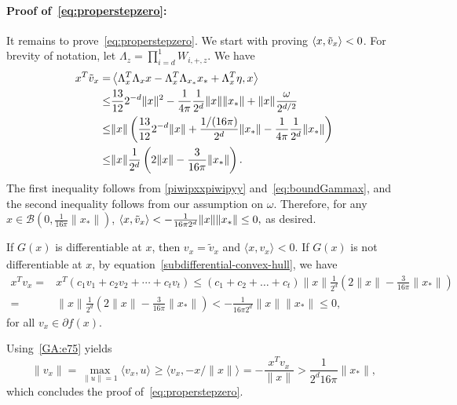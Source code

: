 \documentclass[11pt]{article}
\newcommand{\inner}[3][]{{\langle #2,#3 \rangle_{#1}}} %
\newcommand{\Tnorm}{}
\newcommand\norm[2][\Tnorm]{\ensuremath{{\left\|#2\right\|}_{#1}}}
\newcommand\Tinnerprod{}
\newcommand{\innerprod}[3][\Tinnerprod]{\ifthenelse{\equal{#1}{}}{\ensuremath{\left<#2,#3\right>}}{\ensuremath{\left<#2,#3\right>_{#1}}}}
\newcommand\stepdir[1]{\tilde v_{#1}}
\newcommand{\whcomm}[2]{{\color{black} #1}{\color{black} #2}} %
\begin{document}
\paragraph{Proof of~\eqref{eq:properstepzero}:}
It remains to prove~\eqref{eq:properstepzero}.
We start with proving $\innerprod{x}{\stepdir{x}} < 0$.
For brevity of notation, let $\Lambda_{z} = \prod_{i = d}^1 W_{i, +, z}$.
We have
\whcomm{}{
\begin{align*}
x^T \stepdir{x} =&
\innerprod{ \Lambda_x^T \Lambda_x x - \Lambda_x^T \Lambda_{x_*} x_* + \Lambda_x^T \eta }{x} \\
\leq&
\frac{13}{12}2^{-d} \|x\|^2 - \frac{1}{4 \pi} \frac{1}{2^d} \|x\| \|x_*\| +
\norm{x} \frac{\omega}{2^{d/2}} \\
\leq&
\|x\| \left( \frac{13}{12}2^{-d} \|x\| +
\frac{1/(16 \pi)}{2^{d}} \|x_*\|
- \frac{1}{4 \pi} \frac{1}{2^d} \|x_*\| \right) \\
\leq&
\|x\| \frac{1}{2^d} \left( 2\|x\| - \frac{3}{16 \pi} \|x_*\| \right).
\end{align*}
}
The first inequality follows from \eqref{piwipxxpiwipyy} and~\eqref{eq:boundGammax}, and the second inequality follows from our assumption on $\omega$.
Therefore, for any $x \in \mathcal{B}(0, \frac{1}{16\pi} \|x_*\|)$, 
\whcomm{}{
$
\innerprod{x}{ \stepdir{x} } < -\frac{1}{16 \pi 2^d} \|x\| \|x_*\| \leq 0,
$
}
as desired.

If $G(x)$ is differentiable at $x$, then $v_x = \tilde{v}_x$ and $\inner[]{x}{{v}_x} < 0$. If $G(x)$ is not differentiable at $x$, by equation~\eqref{subdifferential-convex-hull}, we have
\whcomm{}{
\begin{align}
x^T {v}_x =& x^T (c_1 v_1 + c_2 v_2 + \cdots + c_t v_t) \leq (c_1 + c_2 + \ldots + c_t) \|x\| \frac{1}{2^d} \left( 2\|x\| - \frac{3}{16 \pi} \|x_*\| \right) \nonumber \\
=& \|x\| \frac{1}{2^d} \left( 2\|x\| - \frac{3}{16 \pi} \|x_*\| \right) < -\frac{1}{16 \pi 2^d} \|x\| \|x_*\| \leq 0, \label{GA:e75}
\end{align}
}
for all $v_x \in \partial f(x)$.

\whcomm{}{
Using~\eqref{GA:e75} yields
$$
\|v_x\| = \max_{\|u\|=1} \inner[]{v_x}{u} \geq \inner[]{v_x}{-x/\|x\|} = -\frac{x^T {v}_x}{\|x\|} > \frac{1}{2^d 16\pi} \|x_*\|,
$$
which concludes the proof of~\eqref{eq:properstepzero}.
}
\end{document}
